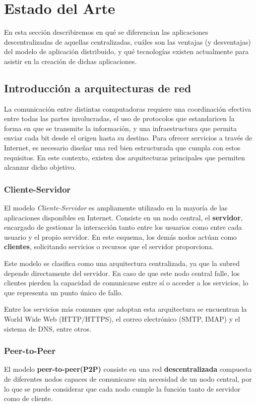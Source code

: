 \section{Estado del Arte}
En esta sección describiremos en qué se diferencian las aplicaciones descentralizadas de aquellas centralizadas, cuáles son las ventajas (y desventajas) del modelo de aplicación distribuido, y qué tecnologías existen actualmente para asistir en la creación de dichas aplicaciones. 

\subsection{Introducción a arquitecturas de red}
La comunicación entre distintas computadoras requiere una coordinación efectiva entre todas las partes involucradas, el uso de protocolos que estandaricen la forma en que se transmite la información, y una infraestructura que permita enviar cada bit desde el origen hasta su destino. Para ofrecer servicios a través de Internet, es necesario diseñar una red bien estructurada que cumpla con estos requisitos. En este contexto, existen dos arquitecturas principales que permiten alcanzar dicho objetivo.

\subsubsection*{Cliente-Servidor}

El modelo \textit{Cliente-Servidor} es ampliamente utilizado en la mayoría de las aplicaciones disponibles en Internet. Consiste en un nodo central, el \textbf{servidor}, encargado de gestionar la interacción tanto entre los usuarios como entre cada usuario y el propio servidor. En este esquema, los demás nodos actúan como \textbf{clientes}, solicitando servicios o recursos que el servidor proporciona.

Este modelo se clasifica como una arquitectura centralizada, ya que la subred depende directamente del servidor. En caso de que este nodo central falle, los clientes pierden la capacidad de comunicarse entre sí o acceder a los servicios, lo que representa un punto único de fallo.

Entre los servicios más comunes que adoptan esta arquitectura se encuentran la World Wide Web (HTTP/HTTPS), el correo electrónico (SMTP, IMAP) y el sistema de DNS, entre otros.

\subsubsection*{Peer-to-Peer}
El modelo \textbf{peer-to-peer(P2P)} consiste en una red \textbf{descentralizada} compuesta de diferentes nodos capaces de comunicarse sin necesidad de un nodo central, por lo que se puede considerar que cada nodo cumple la función tanto de servidor como de cliente.

